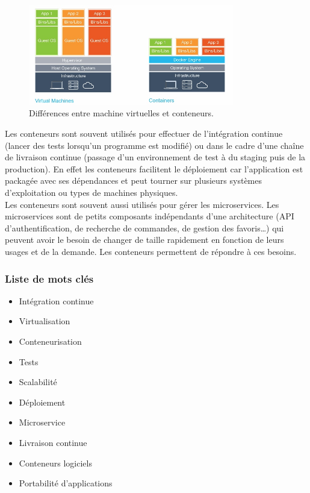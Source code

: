     \begin{figure}[h]
      \centering
      \includegraphics[width=0.8\textwidth]{images/vms-containers.jpg}
      \caption{Différences entre machine virtuelles et conteneurs.\cite{whatIsDocker}}
      \label{fig:vms-containers}
    \end{figure}

    Les conteneurs sont souvent utilisés pour effectuer de l'intégration continue (lancer des tests lorsqu'un programme est modifié) ou dans le cadre d'une chaîne de livraison continue (passage d'un environnement de test à du staging puis de la production). En effet les conteneurs facilitent le déploiement car l'application est packagée avec ses dépendances et peut tourner sur plusieurs systèmes d'exploitation ou types de machines physiques.\\

    Les conteneurs sont souvent aussi utilisés pour gérer les microservices. Les microservices sont de petits composants indépendants d'une architecture (API d'authentification, de recherche de commandes, de gestion des favoris\dots) qui peuvent avoir le besoin de changer de taille rapidement en fonction de leurs usages et de la demande. Les conteneurs permettent de répondre à ces besoins.

    \subsubsection{Liste de mots clés}
        \begin{itemize}
            \item Intégration continue
            \item Virtualisation
            \item Conteneurisation
            \item Tests
            \item Scalabilité
            \item Déploiement
            \item Microservice
            \item Livraison continue
            \item Conteneurs logiciels
            \item Portabilité d'applications
        \end{itemize}

